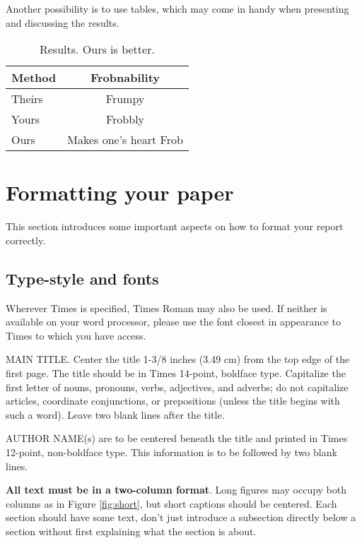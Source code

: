 \documentclass[10pt,twocolumn,letterpaper]{article}
\begin{document}
Another possibility is to use tables, which may come in handy when presenting 
and discussing the results.


\begin{table}[H]
	\begin{center}
		\begin{tabular}{|l|c|}
			\hline
			Method & Frobnability \\
			\hline\hline
			Theirs & Frumpy \\
			Yours & Frobbly \\
			Ours & Makes one's heart Frob\\
			\hline
		\end{tabular}
	\end{center}
	\caption{Results.   Ours is better.}
	\label{tab:1}
\end{table}

\section{Formatting your paper}




This section introduces some important aspects on how to format your report 
correctly.

\subsection{Type-style and fonts}

Wherever Times is specified, Times Roman may also be used. If neither is
available on your word processor, please use the font closest in
appearance to Times to which you have access.

MAIN TITLE. Center the title 1-3/8 inches (3.49 cm) from the top edge of
the first page. The title should be in Times 14-point, boldface type.
Capitalize the first letter of nouns, pronouns, verbs, adjectives, and
adverbs; do not capitalize articles, coordinate conjunctions, or
prepositions (unless the title begins with such a word). Leave two blank
lines after the title.

AUTHOR NAME(s) are to be centered beneath the title
and printed in Times 12-point, non-boldface type. This information is to
be followed by two blank lines.

\textbf{All text must be in a two-column format}. Long figures may occupy 
both columns as in Figure \ref{fig:short}, but short captions should be 
centered. 
Each section should have some text, don't just introduce a subsection 
directly below a section without first explaining what the section is about.
\end{document}
